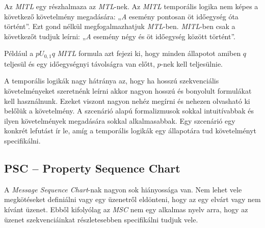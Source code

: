 Az \textit{MITL} egy részhalmaza az \textit{MTL}-nek.
Az \textit{MITL} temporális logika nem képes a következő követelmény megadására: „\textit{A} esemény pontosan öt időegység óta történt”.
Ezt gond nélkül megfogalmazhatjuk \textit{MTL}-ben.
\textit{MITL}-ben csak a következőt tudjuk leírni: „\textit{A} esemény négy és öt időegység között történt”.

Például a $p U_{0,1} q$ \textit{MITL} formula azt fejezi ki, hogy minden állapotot amiben $q$ teljesül és egy időegységnyi távolságra van előtt, $p$-nek kell teljesülnie.

A temporális logikák nagy hátránya az, hogy ha hosszú szekvenciális követelményeket szeretnénk leírni akkor nagyon hosszú és bonyolult formulákat kell használnunk.
Ezeket viszont nagyon nehéz megírni és nehezen olvasható ki belőlük a követelmény.
A szcenárió alapú formalizmusok sokkal intuitívabbak és ilyen követelmények megadására sokkal alkalmasabbak.
Egy szcenárió egy konkrét lefutást ír le, amíg a temporális logikák egy állapotára tud követelményt specifikálni.

\subsection{PSC – Property Sequence Chart}
A \textit{Message Sequence Chart}-nak nagyon sok hiányossága van.
Nem lehet vele megkötéseket definiálni vagy egy üzenetről eldönteni, hogy az egy elvárt vagy nem kívánt üzenet.
Ebből kifolyólag az \textit{MSC} nem egy alkalmas nyelv arra, hogy az üzenet szekvenciáinkat részletesebben specifikálni tudjuk vele.

